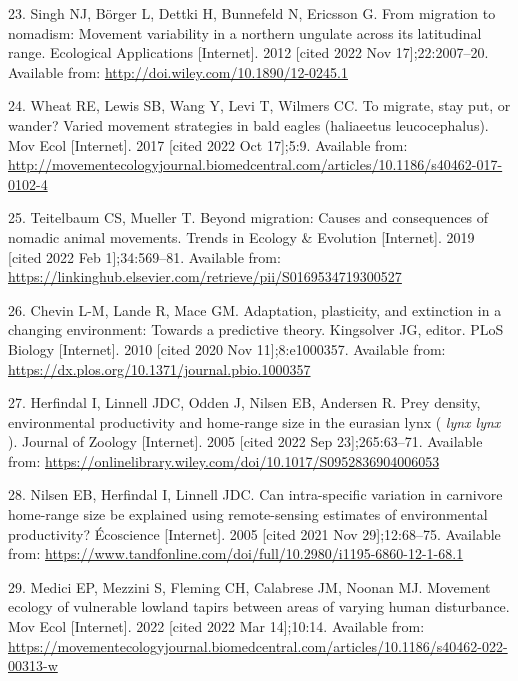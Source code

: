 \documentclass[
  12pt,
]{article}
\newlength{\cslhangindent}
\newenvironment{CSLReferences}[2] %
 {\begin{list}{}{%
  \setlength{\itemindent}{0pt}
  \setlength{\leftmargin}{0pt}
  \setlength{\parsep}{0pt}
  \ifodd #1
   \setlength{\leftmargin}{\cslhangindent}
   \setlength{\itemindent}{-1\cslhangindent}
  \fi
  \setlength{\itemsep}{#2\baselineskip}}}
 {\end{list}}
\begin{document}
\begin{CSLReferences}{0}{1}
23. Singh NJ, Börger L, Dettki H, Bunnefeld N, Ericsson G. From migration to nomadism: Movement variability in a northern ungulate across its latitudinal range. Ecological Applications {[}Internet{]}. 2012 {[}cited 2022 Nov 17{]};22:2007--20. Available from: \url{http://doi.wiley.com/10.1890/12-0245.1}

24. Wheat RE, Lewis SB, Wang Y, Levi T, Wilmers CC. To migrate, stay put, or wander? Varied movement strategies in bald eagles (haliaeetus leucocephalus). Mov Ecol {[}Internet{]}. 2017 {[}cited 2022 Oct 17{]};5:9. Available from: \url{http://movementecologyjournal.biomedcentral.com/articles/10.1186/s40462-017-0102-4}

25. Teitelbaum CS, Mueller T. Beyond migration: Causes and consequences of nomadic animal movements. Trends in Ecology \& Evolution {[}Internet{]}. 2019 {[}cited 2022 Feb 1{]};34:569--81. Available from: \url{https://linkinghub.elsevier.com/retrieve/pii/S0169534719300527}

26. Chevin L-M, Lande R, Mace GM. Adaptation, plasticity, and extinction in a changing environment: Towards a predictive theory. Kingsolver JG, editor. {PLoS} Biology {[}Internet{]}. 2010 {[}cited 2020 Nov 11{]};8:e1000357. Available from: \url{https://dx.plos.org/10.1371/journal.pbio.1000357}

27. Herfindal I, Linnell JDC, Odden J, Nilsen EB, Andersen R. Prey density, environmental productivity and home‐range size in the eurasian lynx ( \emph{lynx lynx} ). Journal of Zoology {[}Internet{]}. 2005 {[}cited 2022 Sep 23{]};265:63--71. Available from: \url{https://onlinelibrary.wiley.com/doi/10.1017/S0952836904006053}

28. Nilsen EB, Herfindal I, Linnell JDC. Can intra-specific variation in carnivore home-range size be explained using remote-sensing estimates of environmental productivity? Écoscience {[}Internet{]}. 2005 {[}cited 2021 Nov 29{]};12:68--75. Available from: \url{https://www.tandfonline.com/doi/full/10.2980/i1195-6860-12-1-68.1}

29. Medici EP, Mezzini S, Fleming CH, Calabrese JM, Noonan MJ. Movement ecology of vulnerable lowland tapirs between areas of varying human disturbance. Mov Ecol {[}Internet{]}. 2022 {[}cited 2022 Mar 14{]};10:14. Available from: \url{https://movementecologyjournal.biomedcentral.com/articles/10.1186/s40462-022-00313-w}


\end{CSLReferences}
\end{document}
